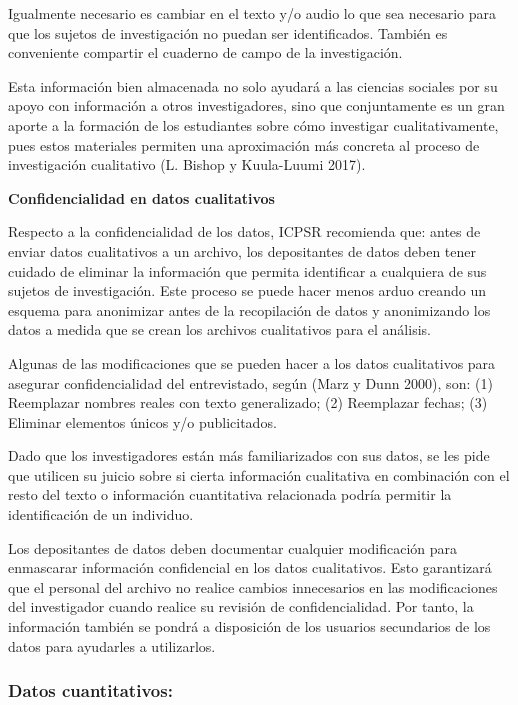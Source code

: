 \documentclass[
  spanish,
  letterpaper,
  DIV=11,
  numbers=noendperiod]{scrreprt}
\begin{document}
Igualmente necesario es cambiar en el texto y/o audio lo que sea
necesario para que los sujetos de investigación no puedan ser
identificados. También es conveniente compartir el cuaderno de campo de
la investigación.

Esta información bien almacenada no solo ayudará a las ciencias sociales
por su apoyo con información a otros investigadores, sino que
conjuntamente es un gran aporte a la formación de los estudiantes sobre
cómo investigar cualitativamente, pues estos materiales permiten una
aproximación más concreta al proceso de investigación cualitativo (L.
Bishop y Kuula-Luumi 2017).

\textbf{Confidencialidad en datos cualitativos}

Respecto a la confidencialidad de los datos, ICPSR recomienda que: antes
de enviar datos cualitativos a un archivo, los depositantes de datos
deben tener cuidado de eliminar la información que permita identificar a
cualquiera de sus sujetos de investigación. Este proceso se puede hacer
menos arduo creando un esquema para anonimizar antes de la recopilación
de datos y anonimizando los datos a medida que se crean los archivos
cualitativos para el análisis.

Algunas de las modificaciones que se pueden hacer a los datos
cualitativos para asegurar confidencialidad del entrevistado, según
(Marz y Dunn 2000), son: (1) Reemplazar nombres reales con texto
generalizado; (2) Reemplazar fechas; (3) Eliminar elementos únicos y/o
publicitados.

Dado que los investigadores están más familiarizados con sus datos, se
les pide que utilicen su juicio sobre si cierta información cualitativa
en combinación con el resto del texto o información cuantitativa
relacionada podría permitir la identificación de un individuo.

Los depositantes de datos deben documentar cualquier modificación para
enmascarar información confidencial en los datos cualitativos. Esto
garantizará que el personal del archivo no realice cambios innecesarios
en las modificaciones del investigador cuando realice su revisión de
confidencialidad. Por tanto, la información también se pondrá a
disposición de los usuarios secundarios de los datos para ayudarles a
utilizarlos.

\subsubsection{Datos cuantitativos:}\label{datos-cuantitativos}
\end{document}
